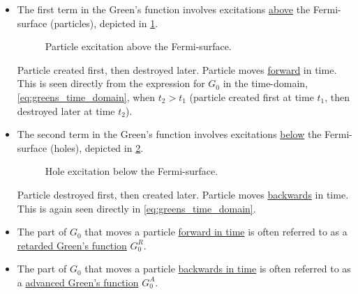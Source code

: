 \begin{itemize}
	\item The first term in the Green's function involves excitations \underline{above} the Fermi-surface (particles), depicted in \cref{fig:fermi_sea_particle_excitation}.
	\begin{figure}
		\centering
		
		\caption{Particle excitation above the Fermi-surface.}
		\label{fig:fermi_sea_particle_excitation}
	\end{figure}
	Particle created first, then destroyed later. Particle moves \underline{forward} in time. This is seen directly from the expression for $G_0$ in the time-domain, \cref{eq:greens_time_domain}, when $t_2 > t_1$ (particle created first at time $t_1$, then destroyed later at time $t_2$).
	\item The second term in the Green's function involves excitations \underline{below} the Fermi-surface (holes), depicted in \cref{fig:fermi_sea_hole_excitation}.
	\begin{figure}
		\centering
		
		\caption{Hole excitation below the Fermi-surface.}
		\label{fig:fermi_sea_hole_excitation}
	\end{figure}
	Particle destroyed first, then created later. Particle moves \underline{backwards} in time. This is again seen directly in \cref{eq:greens_time_domain}.
	\item The part of $G_0$ that moves a particle \underline{forward in time} is often referred to as a \underline{retarded Green's function} $G_0^R$.
	\item The part of $G_0$ that moves a particle \underline{backwards in time} is often referred to as a \underline{advanced Green's function} $G_0^A$.
\end{itemize}


